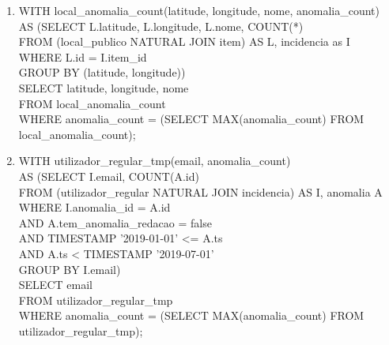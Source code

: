 \documentclass[12pt]{report}
\begin{document}
    \normalsize
    \vspace{2mm}

    \begin{enumerate}
        \item  WITH local\_anomalia\_count(latitude, longitude, nome, anomalia\_count)\\
               AS (SELECT L.latitude, L.longitude, L.nome, COUNT(*) \\
        \hspace*{1em} FROM (local\_publico NATURAL JOIN item) AS L, incidencia as I \\
        \hspace*{1em} WHERE L.id = I.item\_id \\
        \hspace*{1em} GROUP BY (latitude, longitude)) \\
                SELECT latitude, longitude, nome \\
                FROM local\_anomalia\_count \\
                WHERE anomalia\_count = (SELECT MAX(anomalia\_count) FROM local\_anomalia\_count);
        
        \item WITH utilizador\_regular\_tmp(email, anomalia\_count) \\
              AS (SELECT I.email, COUNT(A.id) \\
              \hspace*{1em} FROM (utilizador\_regular NATURAL JOIN incidencia) AS I, anomalia A \\
              \hspace*{1em} WHERE I.anomalia\_id = A.id \\
              \hspace*{1em} AND A.tem\_anomalia\_redacao = false \\
              \hspace*{1em} AND TIMESTAMP '2019-01-01' <= A.ts \\
              \hspace*{1em} AND A.ts < TIMESTAMP '2019-07-01' \\
              \hspace*{1em} GROUP BY I.email) \\
              SELECT email\\
              FROM utilizador\_regular\_tmp \\
              WHERE anomalia\_count = (SELECT MAX(anomalia\_count) FROM utilizador\_regular\_tmp);


\end{enumerate}
\end{document}
